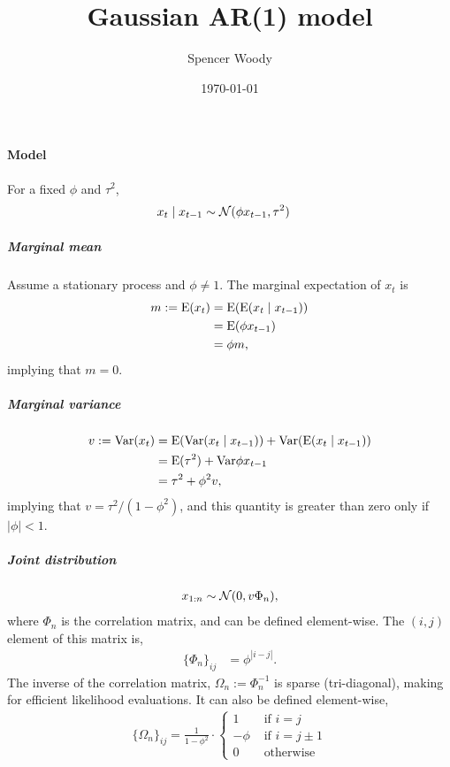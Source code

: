 \documentclass[letter, 10pt]{article}
\title{Gaussian AR(1) model}
\author{Spencer Woody}
\date{\today}
\begin{document}
\maketitle


\paragraph{Model}

For a fixed $\phi$ and $\tau^2$,
\begin{align*}
  x_t \mid x_{t - 1} &\sim \mathcal{N}(\phi x_{t-1}, \tau^2)
\end{align*}

\subparagraph{Marginal mean}

Assume a stationary process and $\phi \neq 1$. The marginal
expectation of $x_t$ is
\begin{align*}
  m := \mathrm{E}(x_t) &= \mathrm{E}(\mathrm{E}(x_t \mid x_{t-1})) \\
               &= \mathrm{E}(\phi x_{t-1}) \\
               &= \phi m ,
\end{align*}
implying that $m = 0$.

\subparagraph{Marginal variance}

\begin{align*}
  v := \mathrm{Var}(x_t) &= \mathrm{E}(\mathrm{Var}(x_t \mid x_{t - 1})) + \mathrm{Var}(\mathrm{E}(x_t \mid x_{t-1}))\\
                 &= \mathrm{E}(\tau^2) + \mathrm{Var}{\phi x_{t-1}} \\
                 &= \tau^2 + \phi^2 v,
\end{align*}
implying that $v = \tau^2 / (1 - \phi^2)$, and this quantity is
greater than zero only if $|\phi| < 1$.

\subparagraph{Joint distribution}

\begin{align*}
  x_{1:n} \sim \mathcal{N}(0, v\Phi_n) ,
\end{align*}
where $\Phi_n$ is the correlation matrix, and can be defined
element-wise. The $(i, j)$ element of this matrix is,
\begin{align*}
  \{\Phi_n\}_{ij} &= \phi^{|i - j|}.
\end{align*}
The inverse of the correlation matrix, $\Omega_n := \Phi_n^{-1}$ is
sparse (tri-diagonal), making for efficient likelihood evaluations. It
can also be defined element-wise,
\begin{align*}
  \{\Omega_n\}_{ij} = \frac{1}{1 - \phi^2} \cdot
  \begin{cases}
    1 & \text{ if } i = j \\
    -\phi & \text{ if } i = j \pm 1 \\
    0 & \text{ otherwise}
  \end{cases}
\end{align*}

\end{document}
